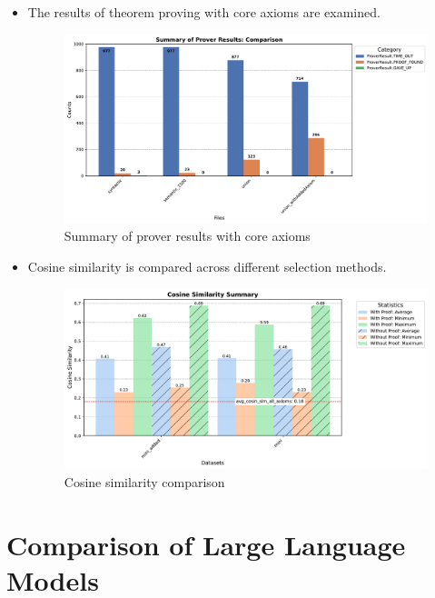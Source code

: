 \documentclass[english,version-2020-11]{uzl-thesis}
\begin{document}
\begin{itemize}
    \item The results of theorem proving with core axioms are examined.
    \begin{figure}[h!]
        \centering
        \includegraphics[width=\textwidth]{standard_mode_output.pdf}
        \caption{Summary of prover results with core axioms}
        \label{fig:prover_results_with_core_axioms}
    \end{figure}
    \FloatBarrier

    \item Cosine similarity is compared across different selection methods.
    \begin{figure}[h!]
        \centering
        \includegraphics[width=\textwidth]{cosine_similarity_mini_summary.pdf}
        \caption{Cosine similarity comparison}
        \label{fig:prover_results_standard}
    \end{figure}
    \FloatBarrier
\end{itemize}

\clearpage

\section{Comparison of Large Language Models}
\end{document}
